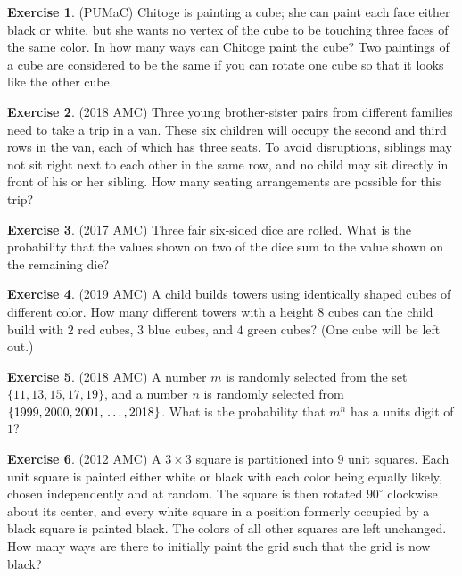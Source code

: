 \documentclass[l1pt]{article}
\theoremstyle{plain}
\theoremstyle{definition}
\newtheorem{exercise}{Exercise}[section]
\theoremstyle{remark}
\begin{document}
\begin{exercise}
(PUMaC) Chitoge is painting a cube; she can paint each face either black or white, but she wants no vertex of the cube to be touching three faces of the same color. In how many ways can Chitoge paint the cube? Two paintings of a cube are considered to be the same if you can rotate one cube so that it looks like the other cube.
\end{exercise}

\begin{exercise}
(2018 AMC) Three young brother-sister pairs from different families need to take a trip in a van. These six children will occupy the second and third rows in the van, each of which has three seats. To avoid disruptions, siblings may not sit right next to each other in the same row, and no child may sit directly in front of his or her sibling. How many seating arrangements are possible for this trip?
\end{exercise}

\begin{exercise}
(2017 AMC) Three fair six-sided dice are rolled. What is the probability that the values shown on two of the dice sum to the value shown on the remaining die?
\end{exercise}

\begin{exercise}
(2019 AMC) A child builds towers using identically shaped cubes of different color. How many different towers with a height $8$ cubes can the child build with $2$ red cubes, $3$ blue cubes, and $4$ green cubes? (One cube will be left out.)
\end{exercise}

\begin{exercise}
(2018 AMC) A number $m$ is randomly selected from the set $\{11,13,15,17,19\}$, and a number $n$ is randomly selected from $\{1999,2000,2001,\newline \ldots,2018\}$. What is the probability that $m^n$ has a units digit of $1$?
\end{exercise}

\begin{exercise}
(2012 AMC) A $3\times3$ square is partitioned into $9$ unit squares. Each unit square is painted either white or black with each color being equally likely, chosen independently and at random. The square is then rotated $90^\circ$ clockwise about its center, and every white square in a position formerly occupied by a black square is painted black. The colors of all other squares are left unchanged. How many ways are there to initially paint the grid such that the grid is now black?
\end{exercise}
\end{document}
